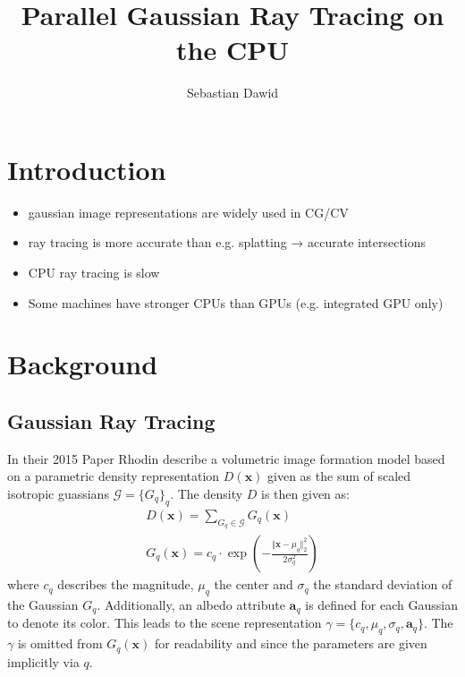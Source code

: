 \documentclass[a4paper, 11pt]{memoir}
\title{Parallel Gaussian Ray Tracing on the CPU}
\author{Sebastian Dawid}
\begin{document}
    \frontmatter
    \smarttitle
    \newpage
    \tableofcontents*

    \clearpage
    \thispagestyle{abs}
    \abstractintoc
    \begin{abstract}
        \lipsum[1]
    \end{abstract}

    \mainmatter
    \chapter{Introduction}
    \begin{itemize}
        \item gaussian image representations are widely used in CG/CV
        \item ray tracing is more accurate than e.g. splatting →  accurate intersections
        \item CPU ray tracing is slow
        \item Some machines have stronger CPUs than GPUs (e.g. integrated GPU only)
    \end{itemize}

    \chapter{Background}
    \label{ch:background}
    \section{Gaussian Ray Tracing}
    \label{sec:int_grt}
    In their 2015 Paper  \cite{Rhodin:2015} Rhodin \etal describe a volumetric image formation
    model based on a parametric density representation $D(\mathbf{x})$ given as the sum of scaled isotropic guassians
    $\mathcal{G} = \{ G_q \}_q$. The density $D$ is then given as:
    \begin{align}
        D(\mathbf{x}) = \sum_{G_q \in \mathcal{G}} G_q(\mathbf{x})
        \label{eq:density}\\
        G_q(\mathbf{x}) = c_q \cdot \exp{\left( - \frac{\Vert\mathbf{x} - \mu_q\Vert_2^2}{2\sigma_q^2} \right)}
        \label{eq:gaussian}
    \end{align}
    where $c_q$ describes the magnitude, $\mu_q$ the center and $\sigma_q$ the standard deviation of the Gaussian $G_q$.
    Additionally, an \gls{albedo} attribute $\mathbf{a}_q$ is defined for each Gaussian to denote its color. This leads
    to the scene representation $\gamma = \{ c_q, \mu_q, \sigma_q, \mathbf{a}_q \}$. The $\gamma$ is omitted from
    $G_q(\mathbf{x})$ for readability and since the parameters are given implicitly via $q$.
\end{document}
